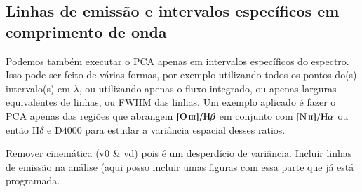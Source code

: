 \subsection{Linhas de emissão e intervalos específicos em comprimento de onda}
\label{sec:UsoPCA:PCAlidades:emlin}

Podemos também executar o PCA apenas em intervalos específicos do espectro. Isso pode ser feito de várias formas, por
exemplo utilizando todos os pontos do(s) intervalo(s) em $\lambda$, ou utilizando apenas o fluxo integrado, ou apenas
larguras equivalentes de linhas, ou FWHM das linhas. Um exemplo aplicado é fazer o PCA apenas das regiões que abrangem
$\oIII/\Hbeta$ em conjunto com $\nII/\Halpha$ ou então $\mathrm{H}\delta$ e D$4000$ para estudar a variância espacial
desses ratios.


\ojo
Remover cinemática (v0 \& vd) pois é um desperdício de variância.
Incluir linhas de emissão na análise (aqui posso incluir umas figuras 
com essa parte que já está programada.

